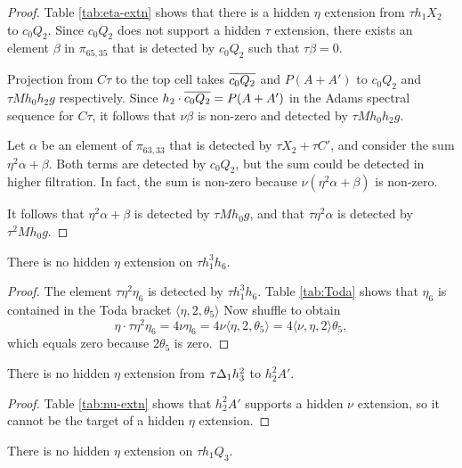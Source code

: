 \begin{proof}
Table \ref{tab:eta-extn} shows that there is a hidden
$\eta$ extension from $\tau h_1 X_2$ to $c_0 Q_2$.
Since $c_0 Q_2$ does not support a hidden $\tau$ extension,
there exists an element $\beta$ in $\pi_{65,35}$ that is 
detected by $c_0 Q_2$ such that $\tau \beta = 0$.

Projection from $C\tau$ to the top cell takes
$\overline{c_0 Q_2}$ and $P(A+A')$ to $c_0 Q_2$ and $\tau M h_0 h_2 g$
respectively.  Since $h_2 \cdot \overline{c_0 Q_2} = P(A+A')$
in the Adams spectral sequence for $C\tau$, it follows that
$\nu \beta$ is non-zero and detected by $\tau M h_0 h_2 g$.

Let $\alpha$ be an element of $\pi_{63,33}$ that is detected
by $\tau X_2 + \tau C'$, and
consider the sum $\eta^2 \alpha + \beta$.
Both terms are detected by $c_0 Q_2$, but the sum could be detected
in higher filtration.  In fact, the sum is non-zero because
$\nu (\eta^2 \alpha + \beta)$ is non-zero.

It follows that $\eta^2 \alpha + \beta$ is detected by $\tau M h_0 g$,
and that $\tau \eta^2 \alpha$ is detected by $\tau^2 M h_0 g$.
\end{proof}

\begin{lemma}
\label{lem:eta-th1^3h6}
There is no hidden $\eta$ extension on $\tau h_1^3 h_6$.
\end{lemma}

\begin{proof}
The element $\tau \eta^2 \eta_6$ is detected by
$\tau h_1^3 h_6$.  Table \ref{tab:Toda} shows that
$\eta_6$ is contained in the Toda bracket
$\langle \eta, 2, \theta_5 \rangle$
Now shuffle to obtain
\[
\eta \cdot \tau \eta^2 \eta_6 = 4 \nu \eta_6 = 
4 \nu \langle \eta, 2, \theta_5 \rangle =
4 \langle \nu, \eta, 2 \rangle \theta_5,
\]
which equals zero because $2 \theta_5$ is zero.
\end{proof}

\begin{lemma}
\label{lem:eta-tD1h3^2}
There is no hidden $\eta$ extension from
$\tau \Delta_1 h_3^2$ to $h_2^2 A'$.
\end{lemma}

\begin{proof}
Table \ref{tab:nu-extn} shows that $h_2^2 A'$
supports a hidden $\nu$ extension, so it cannot be the
target of a hidden $\eta$ extension.
\end{proof}

\begin{lemma}
\label{lem:eta-th1Q3}
There is no hidden $\eta$ extension on $\tau h_1 Q_3$.
\end{lemma}

